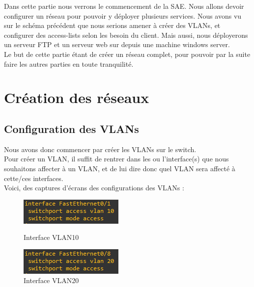 \documentclass[12pt, a4paper]{article}
\begin{document}
\newpage
	Dans cette partie nous verrons le commencement de la SAE. Nous allons
	devoir configurer un réseau pour pouvoir y déployer plusieurs services. 
	Nous avons vu sur le schéma précédent que nous serions amener à créer 
	des VLANs, et configurer des access-lists selon les besoin 
	du client. Mais aussi, nous déployerons un serveur FTP et un serveur web
	sur depuis une machine windows server.\\
	Le but de cette partie étant de créer un réseau complet, pour pouvoir
	par la suite faire les autres parties en toute tranquilité.

	\section{Création des réseaux}
		\subsection{Configuration des VLANs}
		Nous avons donc commencer par créer les VLANs sur le switch.\\
		Pour créer un VLAN, il suffit de rentrer dans les ou l'interface(s) 
		que nous souhaitons affecter à un VLAN, et de lui dire donc quel VLAN
		sera affecté à cette/ces interfaces.\\
		Voici, des captures d'écrans des configurations des VLANs :\\[0.5cm]
		\begin{figure}[h]
			\begin{minipage}[c]{.46\linewidth}
				\centering
				\includegraphics{../screens/SW/Interface-VLAN10.png}
				\caption{Interface VLAN10}
			\end{minipage}
			\hfill%
			\begin{minipage}[c]{.46\linewidth}
				\centering
				\includegraphics{../screens/SW/Interface-VLAN20.png}
				\caption{Interface VLAN20}
			\end{minipage}
		\end{figure}
\end{document}
